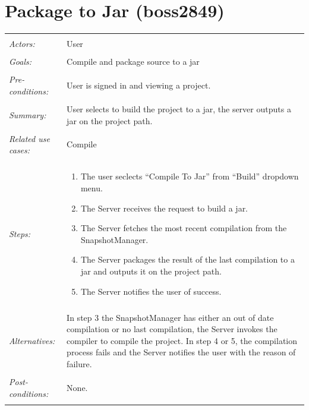 \documentclass[11pt]{report}
\begin{document}
\section{Package to Jar (boss2849)}
\begin{tabular}{ p{2cm} p{12cm} }
 \hline
 \\
 \textit{Actors:} & User \\ 
 \\
 \textit{Goals:} & Compile and package source to a jar\\
 \\
 \textit{Pre-conditions:} & User is signed in and viewing a project. \\
 \\
 \textit{Summary:} & User selects to build the project to a jar, the server outputs a jar on the project path. \\
 \\
 \textit{Related use cases:} & Compile \\ 
 \\
 \textit{Steps:} & \begin{enumerate}
  \item The user seclects ``Compile To Jar'' from ``Build'' dropdown menu.
  \item The Server receives the request to build a jar.
  \item The Server fetches the most recent compilation from the SnapshotManager.
  \item The Server packages the result of the last compilation to a jar and outputs it on the project path.
  \item The Server notifies the user of success.
 \end{enumerate} \\
 \\
 \textit{Alternatives:} & In step 3 the SnapshotManager has either an out of date compilation or no last compilation, the Server invokes the compiler to compile the project. In step 4 or 5, the compilation process fails and the Server notifies the user with the reason of failure. \\
 \\
 \textit{Post-conditions:} & None. \\
 \\
\hline
\end{tabular}
\end{document}
